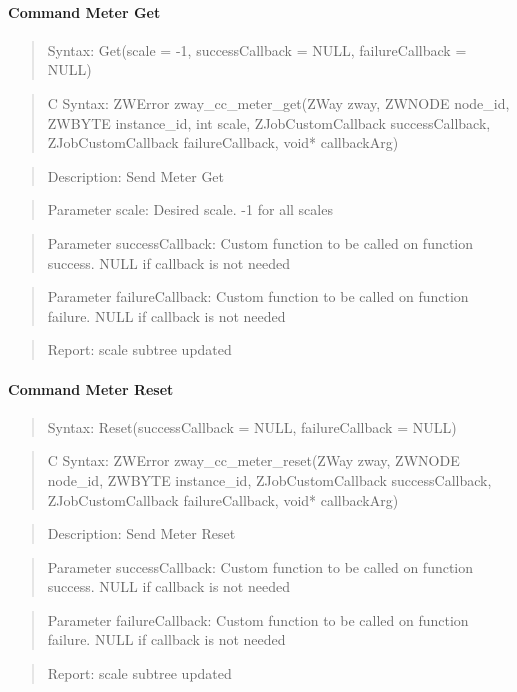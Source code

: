 \paragraph{Command Meter Get}
\begin{quote}Syntax: Get(scale = -1, successCallback = NULL, failureCallback = NULL)\end{quote}
\begin{quote}C Syntax: ZWError zway\_cc\_meter\_get(ZWay zway, ZWNODE node\_id, ZWBYTE instance\_id, int scale, ZJobCustomCallback successCallback, ZJobCustomCallback failureCallback, void* callbackArg)\end{quote}
\begin{quote}Description: Send Meter Get\end{quote}
\begin{quote}Parameter scale: Desired scale. -1 for all scales\end{quote}
\begin{quote}Parameter successCallback: Custom function to be called on function success. NULL if callback is not needed\end{quote}
\begin{quote}Parameter failureCallback: Custom function to be called on function failure. NULL if callback is not needed\end{quote}
\begin{quote}Report: scale subtree updated\end{quote}

\paragraph{Command Meter Reset}
\begin{quote}Syntax: Reset(successCallback = NULL, failureCallback = NULL)\end{quote}
\begin{quote}C Syntax: ZWError zway\_cc\_meter\_reset(ZWay zway, ZWNODE node\_id, ZWBYTE instance\_id, ZJobCustomCallback successCallback, ZJobCustomCallback failureCallback, void* callbackArg)\end{quote}
\begin{quote}Description: Send Meter Reset\end{quote}
\begin{quote}Parameter successCallback: Custom function to be called on function success. NULL if callback is not needed\end{quote}
\begin{quote}Parameter failureCallback: Custom function to be called on function failure. NULL if callback is not needed\end{quote}
\begin{quote}Report: scale subtree updated\end{quote}


